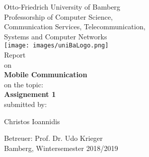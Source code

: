 \documentclass[10pt,a4paper]{article}
\author{Christos Ioannidis}
\begin{document}
\begin{titlepage}
		\begin{center}
		\small Otto-Friedrich University of Bamberg\\
		\vspace{5mm}
		\LARGE Professorship of Computer Science,\\
		Communication Services, Telecommunication,\\
		Systems and Computer Networks\\
		\vspace{8mm}
		\texttt{[image: images/uniBaLogo.png]}\\
		\vspace{10mm}
		\LARGE Report\\
		\vspace{2mm}
		\small on\\
		\vspace{5mm}
		\LARGE \textbf{Mobile Communication}\\
		\vspace{15mm}
		\normalsize on the topic:\\
		\vspace{5mm}
		\huge \textbf{Assignement 1} \\
		\vspace{5mm}
		\small submitted by:\\
		\vspace{5mm}
		
		Christos Ioannidis\\
		\vspace{10mm}
		
		\small Betreuer: Prof. Dr. Udo Krieger\\
		\vspace{2mm}
		Bamberg, Wintersemester 2018/2019
		
	\end{center}
\end{titlepage}

\tableofcontents

\newpage
{}
\listoffigures
\newpage








\newpage

\newpage

\newpage
\end{document}
